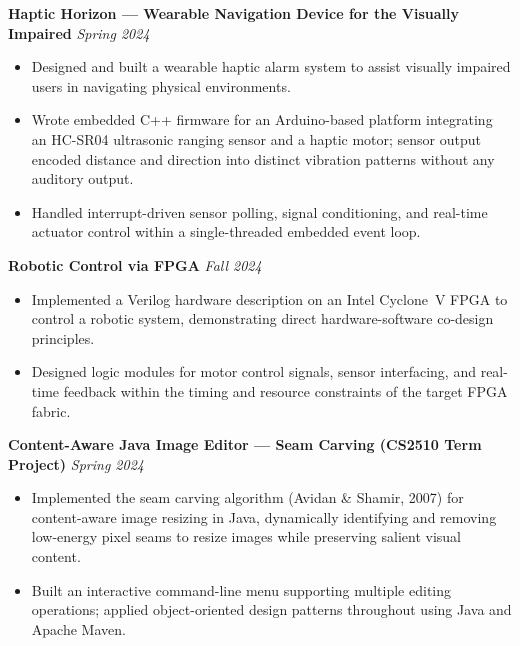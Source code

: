 \documentclass[10pt, letterpaper]{article}
\newcommand{\cvproject}[2]{\textbf{#1} \hfill \textit{#2}\vspace{1pt}}
\begin{document}
\vspace{4pt}

\cvproject{Haptic Horizon --- Wearable Navigation Device for the Visually Impaired}{Spring 2024}
\begin{itemize}
  \item Designed and built a wearable haptic alarm system to assist visually impaired users in
        navigating physical environments.
  \item Wrote embedded C++ firmware for an Arduino-based platform integrating an HC-SR04
        ultrasonic ranging sensor and a haptic motor; sensor output encoded distance and direction
        into distinct vibration patterns without any auditory output.
  \item Handled interrupt-driven sensor polling, signal conditioning, and real-time actuator
        control within a single-threaded embedded event loop.
\end{itemize}

\vspace{4pt}

\cvproject{Robotic Control via FPGA}{Fall 2024}
\begin{itemize}
  \item Implemented a Verilog hardware description on an Intel Cyclone~V FPGA to control a
        robotic system, demonstrating direct hardware-software co-design principles.
  \item Designed logic modules for motor control signals, sensor interfacing, and real-time
        feedback within the timing and resource constraints of the target FPGA fabric.
\end{itemize}

\vspace{4pt}

\cvproject{Content-Aware Java Image Editor --- Seam Carving (CS2510 Term Project)}{Spring 2024}
\begin{itemize}
  \item Implemented the seam carving algorithm (Avidan \& Shamir, 2007) for content-aware image
        resizing in Java, dynamically identifying and removing low-energy pixel seams to resize
        images while preserving salient visual content.
  \item Built an interactive command-line menu supporting multiple editing operations; applied
        object-oriented design patterns throughout using Java and Apache Maven.
\end{itemize}

\vspace{4pt}
\end{document}
